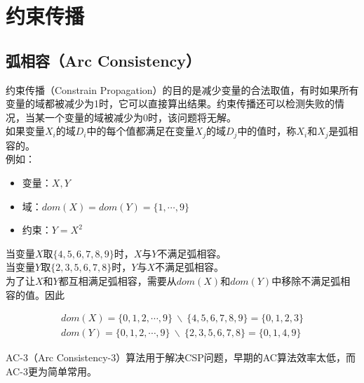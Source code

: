 \newpage

\section{约束传播}

\subsection{弧相容（Arc Consistency）}

约束传播（Constrain Propagation）的目的是减少变量的合法取值，有时如果所有变量的域都被减少为1时，它可以直接算出结果。约束传播还可以检测失败的情况，当某一个变量的域被减少为0时，该问题将无解。\\

如果变量$ X_i $的域$ D_i $中的每个值都满足在变量$ X_j $的域$ D_j $中的值时，称$ X_i $和$ X_j $是弧相容的。\\

例如：

\begin{itemize}
    \item 变量：$ X, Y $
    \item 域：$ dom(X) = dom(Y) = \{1, \cdots, 9\} $
    \item 约束：$ Y = X^2 $
\end{itemize}

当变量$ X $取$ \{4, 5, 6, 7, 8, 9\} $时，$ X $与$ Y $不满足弧相容。\\

当变量$ Y $取$ \{2, 3, 5, 6, 7, 8\} $时，$ Y $与$ X $不满足弧相容。\\

为了让$ X $和$ Y $都互相满足弧相容，需要从$ dom(X) $和$ dom(Y) $中移除不满足弧相容的值。因此

\vspace{-1cm}

\begin{align*}
    dom(X) = \{0, 1, 2, \cdots, 9\}\ \backslash \ \{4, 5, 6, 7, 8, 9\} = \{0, 1, 2, 3\} \\
    dom(Y) = \{0, 1, 2, \cdots, 9\}\ \backslash \ \{2, 3, 5, 6, 7, 8\} = \{0, 1, 4, 9\}
\end{align*}

AC-3（Arc Consistency-3）算法用于解决CSP问题，早期的AC算法效率太低，而AC-3更为简单常用。\\


